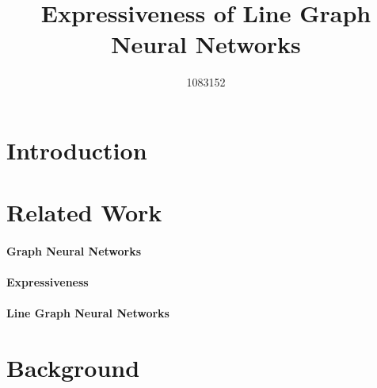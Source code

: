 \documentclass{article}
\title{Expressiveness of Line Graph Neural Networks}
\author{%
    1083152
}
\begin{document}
\maketitle


\begin{abstract}

\end{abstract}


\section{Introduction}








\section{Related Work}

\paragraph{Graph Neural Networks}


\paragraph{Expressiveness}
% 

\paragraph{Line Graph Neural Networks}



\section{Background}
\end{document}
